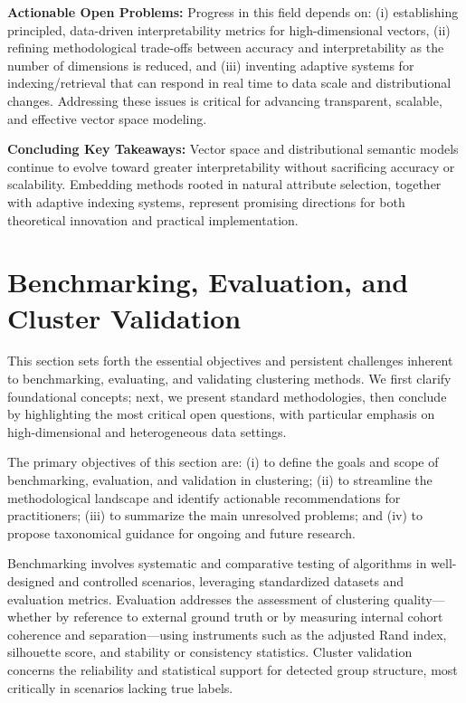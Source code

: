 \documentclass[sigconf]{acmart}
\begin{document}
\textbf{Actionable Open Problems:} Progress in this field depends on: (i) establishing principled, data-driven interpretability metrics for high-dimensional vectors, (ii) refining methodological trade-offs between accuracy and interpretability as the number of dimensions is reduced, and (iii) inventing adaptive systems for indexing/retrieval that can respond in real time to data scale and distributional changes. Addressing these issues is critical for advancing transparent, scalable, and effective vector space modeling.

\textbf{Concluding Key Takeaways:} Vector space and distributional semantic models continue to evolve toward greater interpretability without sacrificing accuracy or scalability. Embedding methods rooted in natural attribute selection, together with adaptive indexing systems, represent promising directions for both theoretical innovation and practical implementation.

\section{Benchmarking, Evaluation, and Cluster Validation}

This section sets forth the essential objectives and persistent challenges inherent to benchmarking, evaluating, and validating clustering methods. We first clarify foundational concepts; next, we present standard methodologies, then conclude by highlighting the most critical open questions, with particular emphasis on high-dimensional and heterogeneous data settings.

The primary objectives of this section are: (i) to define the goals and scope of benchmarking, evaluation, and validation in clustering; (ii) to streamline the methodological landscape and identify actionable recommendations for practitioners; (iii) to summarize the main unresolved problems; and (iv) to propose taxonomical guidance for ongoing and future research.

Benchmarking involves systematic and comparative testing of algorithms in well-designed and controlled scenarios, leveraging standardized datasets and evaluation metrics. Evaluation addresses the assessment of clustering quality---whether by reference to external ground truth or by measuring internal cohort coherence and separation---using instruments such as the adjusted Rand index, silhouette score, and stability or consistency statistics. Cluster validation concerns the reliability and statistical support for detected group structure, most critically in scenarios lacking true labels.
\end{document}
